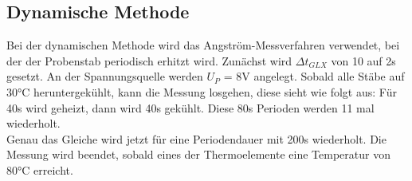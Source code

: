\subsection{Dynamische Methode}
Bei der dynamischen Methode wird das Angström-Messverfahren verwendet, bei der 
der Probenstab periodisch erhitzt wird. Zunächst wird $\Delta t_{GLX}$ von 10 auf 
2s gesetzt. An der Spannungsquelle werden $U_P$ = 8V angelegt. Sobald alle
Stäbe auf 30°C heruntergekühlt, kann die Messung losgehen, diese sieht wie
folgt aus: Für 40s wird geheizt, dann wird 40s gekühlt. Diese 80s Perioden
werden 11 mal wiederholt.
\\
Genau das Gleiche wird jetzt für eine Periodendauer mit 200s wiederholt. Die 
Messung wird beendet, sobald eines der Thermoelemente eine Temperatur von 80°C 
erreicht.